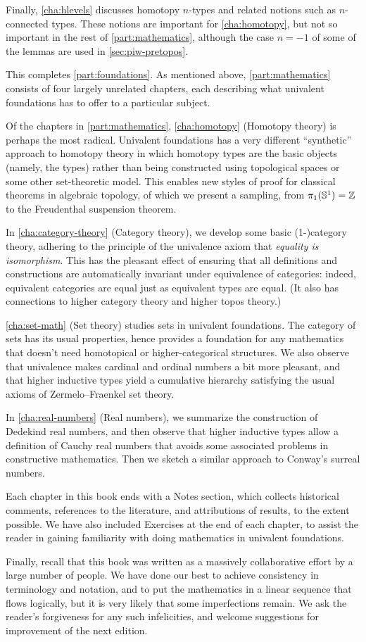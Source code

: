 Finally, \autoref{cha:hlevels} discusses homotopy $n$-types and related notions such as $n$-connected types.
These notions are important for \autoref{cha:homotopy}, but not so important in the rest of \autoref{part:mathematics}, although the case $n=-1$ of some of the lemmas are used in \autoref{sec:piw-pretopos}.

This completes \autoref{part:foundations}.
As mentioned above, \autoref{part:mathematics} consists of four largely unrelated chapters, each describing what univalent foundations has to offer to a particular subject.

Of the chapters in \autoref{part:mathematics}, \autoref{cha:homotopy} (Homotopy theory) is perhaps the most radical.
Univalent foundations has a very different ``synthetic'' approach to homotopy theory in which homotopy types are the basic objects (namely, the types) rather than being constructed using topological spaces or some other set-theoretic model.
This enables new styles of proof for classical theorems in algebraic topology, of which we present a sampling, from $\pi_1(\mathbb{S}^1)=\mathbb{Z}$ to the Freudenthal suspension theorem.

In \autoref{cha:category-theory} (Category theory), we develop some basic (1-)category theory, adhering to the principle of the univalence axiom that \emph{equality is isomorphism}.
This has the pleasant effect of ensuring that all definitions and constructions are automatically invariant under equivalence of categories: indeed, equivalent categories are equal just as equivalent types are equal.
(It also has connections to higher category theory and higher topos theory.)

\autoref{cha:set-math} (Set theory) studies sets in univalent foundations.
The category of sets has its usual properties, hence provides a foundation for any mathematics that doesn't need homotopical or higher-categorical structures.
We also observe that univalence makes cardinal and ordinal numbers a bit more pleasant, and that higher inductive types yield a cumulative hierarchy satisfying the usual axioms of Zermelo--Fraenkel set theory.

In \autoref{cha:real-numbers} (Real numbers), we summarize the construction of Dedekind real numbers, and then observe that higher inductive types allow a definition of Cauchy real numbers that avoids some associated problems in constructive mathematics.
Then we sketch a similar approach to Conway's surreal numbers.

Each chapter in this book ends with a Notes section, which collects historical comments, references to the literature, and attributions of results, to the extent possible.
We have also included Exercises at the end of each chapter, to assist the reader in gaining familiarity with doing mathematics in univalent foundations.

Finally, recall that this book was written as a massively collaborative effort by a large number of people.
We have done our best to achieve consistency in terminology and notation, and to put the mathematics in a linear sequence that flows logically, but it is very likely that some imperfections remain.
We ask the reader's forgiveness for any such infelicities, and welcome suggestions for improvement of the next edition.


